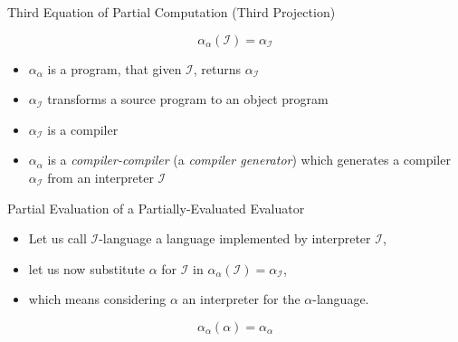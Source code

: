 \documentclass[aspectratio=169,dvipsnames]{beamer}
\newcommand{\I}{\ensuremath{\mathcal{I}}\xspace}
\begin{document}
\begin{frame}{Third Equation of Partial Computation (Third Projection)}

    \begin{center}
    
        
    \end{center}

    \begin{equation}
    \alpha_\alpha(\mathcal{I}) =  \alpha_\mathcal{I}
    \end{equation}
    
    \begin{itemize}
     \item $\alpha_\alpha$ is a program, that given \I, returns $\alpha_\I$
     \item $\alpha_\I$ transforms a source program to an object program
     \item $\alpha_\I$ is a compiler
     \item $\alpha_\alpha$ is a \textit{compiler-compiler} (a \textit{compiler generator})
            which generates a compiler $\alpha_\I$ from an interpreter $\I$
    \end{itemize}
\end{frame}

\begin{frame}{Partial Evaluation of a Partially-Evaluated Evaluator}

    \begin{itemize}
    \item Let us call \I-language a language implemented by interpreter \I,  
    \item let us now substitute $\alpha$ for $\I$ in $\alpha_\alpha(\mathcal{I}) = \alpha_\mathcal{I}$,
    \item which means considering $\alpha$ an interpreter for the $\alpha$-language.
    \end{itemize}

    \[
        \alpha_\alpha(\alpha)=\alpha_\alpha    
    \]


\end{frame}
\end{document}
